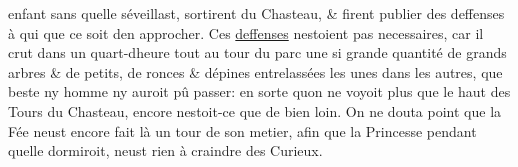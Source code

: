 \documentclass[14pt,a4paper]{memoir}
\newcommand{\ul}[1]{\uline{#1}}
\begin{document}
{{\begin{otherlanguage}{french}
enfant sans qu\textquotesingle elle s\textquotesingle éveillast,
sortirent du Chasteau, \& firent publier des deffenses à qui que ce soit
d\textquotesingle en approcher. Ces \ul{deffenses}
n\textquotesingle estoient pas necessaires, car il crut dans un
quart-d\textquotesingle heure tout au tour du parc une si grande
quantité de grands arbres \& de petits, de ronces \&
d\textquotesingle épines entrelassées les unes dans les autres, que
beste ny homme n\textquotesingle y auroit pû passer: en sorte
qu\textquotesingle on ne voyoit plus que le haut des Tours du Chasteau,
encore n\textquotesingle estoit-ce que de bien loin. On ne douta point
que la Fée n\textquotesingle eust encore fait là un tour de son metier,
afin que la Princesse pendant qu\textquotesingle elle dormiroit,
n\textquotesingle eust rien à craindre des Curieux.


\end{otherlanguage}}}
\end{document}

